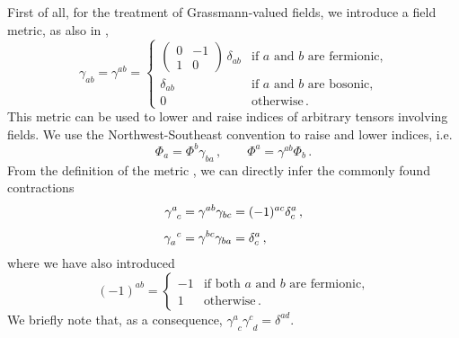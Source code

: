 \documentclass[10pt,prd,nofootinbib,superscriptaddress,twocolumn]{revtex4-2}
\begin{document}
First of all, for the treatment of Grassmann-valued fields, we introduce a field metric, as also in \cite{Pawlowski:2005xe, Braun:2025gvq},
%
\begin{equation}\label{eq:metric}
	\gamma_{ab} = \gamma^{ab} = \begin{cases}
		\begin{pmatrix}
			0 & -1 \\
			1 & 0
		\end{pmatrix}\,\delta_{ab}
		& \text{if $a$ and $b$ are fermionic,} \\[3ex]
		\delta_{ab} & \text{if $a$ and $b$ are bosonic,}   \\[2ex]
		0               & \text{otherwise} 
		\,.
	\end{cases}
\end{equation}
%
This metric can be used to lower and raise indices of arbitrary tensors involving fields. We use the Northwest-Southeast convention to raise and lower indices, i.e.
%
\begin{equation}
	\Phi_a = \Phi^b\gamma_{ba} \,,
	\quad \quad
	\Phi^a = \gamma^{ab}\Phi_b \,.
\end{equation}
%
From the definition of the metric , we can directly infer the commonly found contractions
%
\begin{align}
	\gamma^{a}_{\phantom{a}c} &= \gamma^{ab}\gamma_{bc} = (-1)^{ac}\delta^a_c
	\,,\notag\\[1ex]
	\gamma_{a}^{\phantom{a}c} &= \gamma^{bc}\gamma_{ba} = \delta^a_c
	\,,
\end{align}
%
where we have also introduced
%
\begin{equation}
	(-1)^{ab} = \begin{cases}
		-1 & \text{if both $a$ and $b$ are fermionic,} \\[1ex]
		1 & \text{otherwise} 
		\,.
	\end{cases}
\end{equation}
%
We briefly note that, as a consequence, $\gamma^{a}_{\phantom{a}c}\gamma^{c}_{\phantom{c}d} = \delta^{ad}$.
\end{document}
